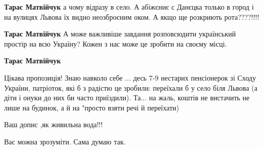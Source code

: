 \begin{itemize}
\begin{itemize}
\textbf{Тарас Матвійчук} а чому відразу в село. А абіжєниє с Данєцка только в город і на вулицях Львова їх видно неозброєним оком. А якщо ще розкриють рота????!!!!

 
\textbf{Тарас Матвійчук} А може важливіше завдання розповсюдити український
простір на всю Україну? Кожен з нас може це зробити на своєму місці.

 
\textbf{Тарас Матвійчук} 

Цікава пропозиція! Знаю навколо себе ... десь 7-9 нестарих пенсіонерок зі Сходу
України, патріоток, які б з радістю це зробили: переїхали б у село біля Львова
(а діти і онуки до них би часто приїздили). Та... на жаль, коштів не вистачить
не лише на будинок, а й на "просто взяти речі й переїхати)

\end{itemize}

 
Ваш допис ,як живильна вода!!!

 
Вас можна зрозуміти. Сама думаю так.

\begin{itemize}
 

\end{itemize}
\end{itemize}
